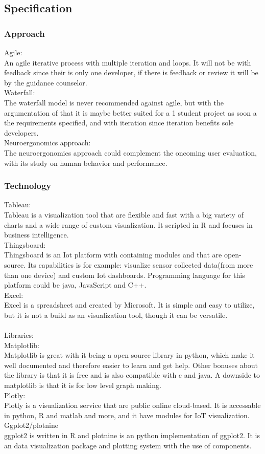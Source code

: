 \documentclass{article}
\begin{document}
\subsection{Specification} 
	\subsubsection{Approach}
		Agile:
			\\An agile iterative process with multiple iteration and loops. It will not be with feedback since their is only one developer, if there is feedback or review it will be by the guidance counselor. 
		\\Waterfall:
			\\The waterfall model is never recommended against agile, but with the argumentation of that it is maybe better suited for a 1 student project as soon a the requirements specified, and with iteration since iteration benefits sole developers.
		\\Neuroergonomics approach: 
			\\The neuroergonomics approach could complement the oncoming user evaluation, with its study on human behavior and performance.\\
	\subsubsection{Technology}
		Tableau:
			\\Tableau is a visualization tool that are flexible and fast with a big variety of charts and a wide range of custom visualization. It scripted in R and focuses in business intelligence.
		\\Thingsboard:
			\\Thingsboard is an Iot platform with containing modules and that are open-source. Its capabilities is for example: visualize sensor collected data(from more than one device) and custom Iot dashboards. Programming language for this platform could be java, JavaScript and C++.
		\\Excel:
			\\Excel is a spreadsheet and created by Microsoft. It is simple and easy to utilize, but it is not a build as an visualization tool, though it can be versatile.\\
		\\Libraries:
			\\Matplotlib:
				\\Matplotlib is great with it being a open source library  in python, which make it well documented and therefore easier to learn and get help. Other bonuses about the library is that it is free and is also compatible with c and java. A downside to matplotlib is that it is for low level graph making. 
			\\Plotly:
				\\Plotly is a visualization service that are public online cloud-based. It is accessable in python, R and matlab and more, and it have modules for IoT visualization. 
			\\Ggplot2/plotnine 
				\\ggplot2 is written in R and plotnine is an python implementation of ggplot2. It is an data visualization package and plotting system with the use of components.
				
\end{document}
